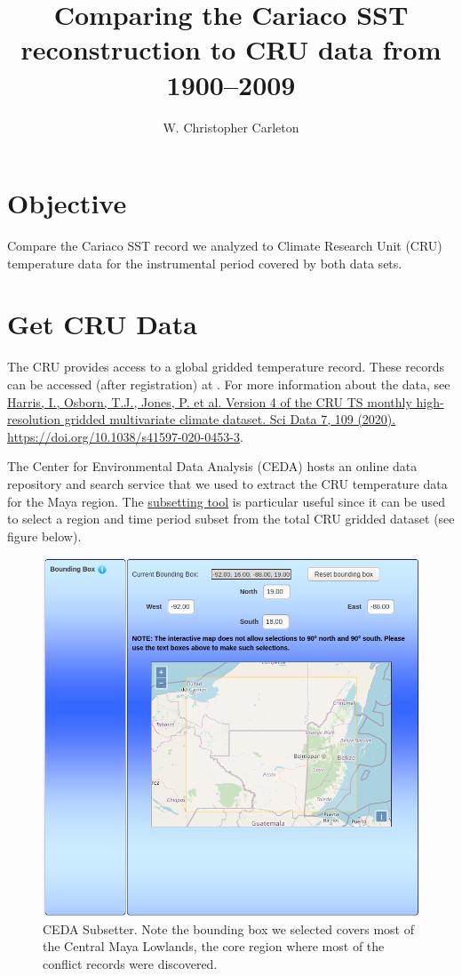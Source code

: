 \documentclass[]{article}
\title{Comparing the Cariaco SST reconstruction to CRU data from 1900--2009}
\author{W. Christopher Carleton}
\date{}
\begin{document}
\maketitle

\section{Objective}\label{objective}

Compare the Cariaco SST record we analyzed to Climate Research Unit
(CRU) temperature data for the instrumental period covered by both data
sets.

\section{Get CRU Data}\label{get-cru-data}

The CRU provides access to a global gridded temperature record. These
records can be accessed (after registration) at . For more information
about the data, see
\href{https://www.nature.com/articles/s41597-020-0453-3}{Harris, I.,
Osborn, T.J., Jones, P. et al. Version 4 of the CRU TS monthly
high-resolution gridded multivariate climate dataset. Sci Data 7, 109
(2020). https://doi.org/10.1038/s41597-020-0453-3}.

The Center for Environmental Data Analysis (CEDA) hosts an online data
repository and search service that we used to extract the CRU
temperature data for the Maya region. The
\href{http://wps-web1.ceda.ac.uk/submit/form?proc_id=Subsetter}{subsetting
tool} is particular useful since it can be used to select a region and
time period subset from the total CRU gridded dataset (see figure
below).

\begin{figure}
\centering
\includegraphics{../assets/img/ceda_subsetter.png}
\caption{CEDA Subsetter. Note the bounding box we selected covers most
of the Central Maya Lowlands, the core region where most of the conflict
records were discovered.}
\end{figure}
\end{document}
